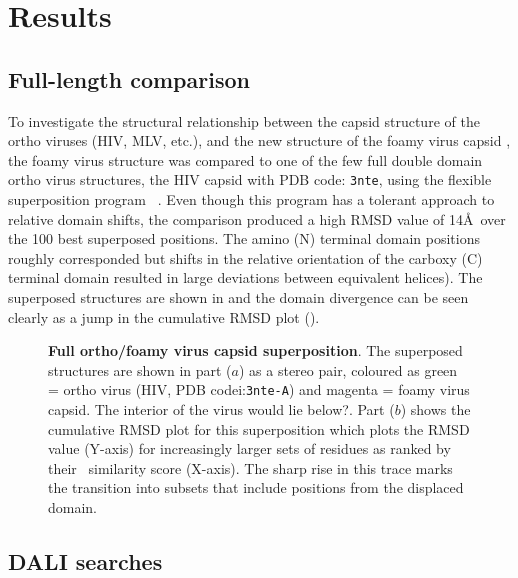 \section{Results}

\subsection{Full-length comparison}

To investigate the structural relationship between the capsid structure of the ortho viruses (HIV, MLV, etc.),
and the new structure of the foamy virus capsid \cite{Ian}, the foamy virus structure was compared to one
of the few full double domain ortho virus structures, the HIV capsid with PDB code: {\tt 3nte}, using the
flexible superposition program \SAP\ \cite{TaylorWR99a}.   Even though this program has a tolerant approach
to relative domain shifts, the comparison produced a high RMSD value of 14\AA\ over the 100 best superposed
positions.   The amino (N) terminal domain positions roughly corresponded but shifts in the relative
orientation of the carboxy (C) terminal domain resulted in large deviations between equivalent helices).  
The superposed structures are shown in  and the domain divergence can be seen clearly as a
jump in the cumulative RMSD plot ().

\begin{figure}
\centering
{}
\begin{footnotesize}
\caption{
\label{Fig:full}
{\bf Full ortho/foamy virus capsid superposition}.
The superposed structures are shown in part ($a$) as a stereo pair, coloured as green = ortho virus (HIV, PDB codei:{\tt 3nte-A})
and magenta = foamy virus capsid.   The interior of the virus would lie below?. 
Part ($b$) shows the cumulative RMSD plot for this superposition which plots the RMSD value (Y-axis) for increasingly larger sets
of residues as ranked by their \SAP\ similarity score (X-axis).   The sharp rise in this trace marks the transition into 
subsets that include positions from the displaced domain.
}
\end{footnotesize}
\end{figure}

\subsection{DALI searches}


